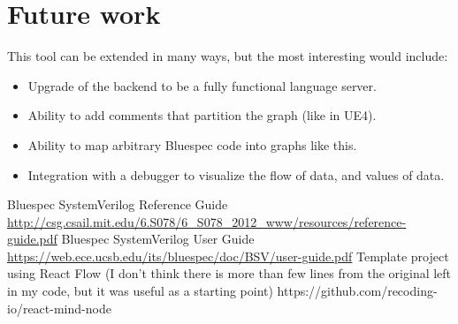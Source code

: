 \documentclass[12pt]{report}
\begin{document}
\section{Future work} 
This tool can be extended in many ways, but the most interesting would include: 
\begin{itemize} 
   \item Upgrade of the backend to be a fully functional language server. 
   \item Ability to add comments that partition the graph (like in UE4).
   \item Ability to map arbitrary Bluespec code into graphs like this. 
   \item Integration with a debugger to visualize the flow of data, and values of data. 
\end{itemize} 
\begin{thebibliography}{9}
   Bluespec SystemVerilog Reference Guide
   \href{http://csg.csail.mit.edu/6.S078/6\_S078\_2012\_www/resources/reference-guide.pdf}{http://csg.csail.mit.edu/6.S078/6\_S078\_2012\_www/resources/reference-guide.pdf}
   Bluespec SystemVerilog User Guide
   \href{https://web.ece.ucsb.edu/its/bluespec/doc/BSV/user-guide.pdf}{https://web.ece.ucsb.edu/its/bluespec/doc/BSV/user-guide.pdf}
   Template project using React Flow (I don't think there is more than few lines from the original left in my code, but it was useful as a starting point)
   https://github.com/recoding-io/react-mind-node
   \end{thebibliography}

\end{document}
